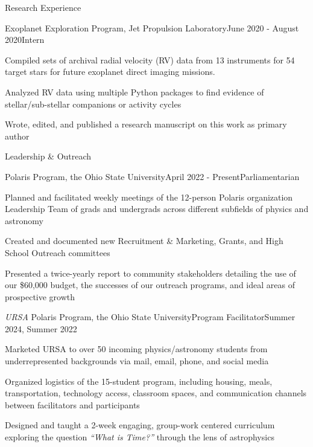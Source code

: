 \documentclass{resume} %
\begin{document}
\begin{rSection}{Research Experience}
\begin{rSubsection}{Exoplanet Exploration Program, Jet Propulsion Laboratory}{June 2020 - August 2020}{Intern}{}
\item Compiled sets of archival radial velocity (RV) data from 13 instruments for 54 target stars for future exoplanet direct imaging missions.
\item Analyzed RV data using multiple Python packages to find evidence of stellar/sub-stellar companions or activity cycles
\item Wrote, edited, and published a research manuscript on this work as primary author
\end{rSubsection}


\end{rSection}

\begin{rSection}{Leadership \& Outreach} 

\begin{rSubsection}{Polaris Program, the Ohio State University}{April 2022 - Present}{Parliamentarian}{}
\item Planned and facilitated weekly meetings of the 12-person Polaris organization Leadership Team of grads and undergrads across different subfields of physics and astronomy
\item Created and documented new Recruitment \& Marketing, Grants, and High School Outreach committees
\item Presented a twice-yearly report to community stakeholders detailing the use of our \$60,000 budget, the successes of our outreach programs, and ideal areas of prospective growth
\end{rSubsection}


\begin{rSubsection}{\textit{URSA} Polaris Program, the Ohio State University}{}{Program Facilitator}{Summer 2024, Summer 2022}
\item Marketed URSA to over 50 incoming physics/astronomy students from underrepresented backgrounds via mail, email, phone, and social media
\item Organized logistics of the 15-student program, including housing, meals, transportation, technology access, classroom spaces, and communication channels between facilitators and participants
\item Designed and taught a 2-week engaging, group-work centered curriculum exploring the question \textit{``What is Time?'' }through the lens of astrophysics
\end{rSubsection}

\end{rSection}
\end{document}
